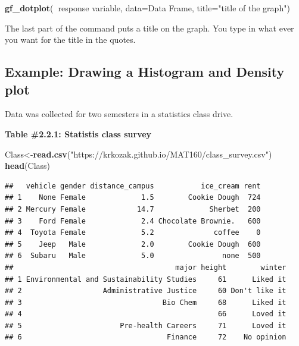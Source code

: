 \documentclass[
]{book}
\newenvironment{Shaded}{\begin{snugshade}}{\end{snugshade}}
\newcommand{\DataTypeTok}[1]{\textcolor[rgb]{0.13,0.29,0.53}{#1}}
\newcommand{\KeywordTok}[1]{\textcolor[rgb]{0.13,0.29,0.53}{\textbf{#1}}}
\newcommand{\NormalTok}[1]{#1}
\newcommand{\OperatorTok}[1]{\textcolor[rgb]{0.81,0.36,0.00}{\textbf{#1}}}
\newcommand{\StringTok}[1]{\textcolor[rgb]{0.31,0.60,0.02}{#1}}
\begin{document}
\begin{Shaded}
\begin{Highlighting}[]
\KeywordTok{gf_dotplot}\NormalTok{(}\OperatorTok{~}\NormalTok{response variable, }\DataTypeTok{data=}\NormalTok{Data Frame, }\DataTypeTok{title=}\StringTok{"title of the graph"}\NormalTok{)}
\end{Highlighting}
\end{Shaded}

The last part of the command puts a title on the graph. You type in what ever you want for the title in the quotes.

\hypertarget{example-drawing-a-histogram-and-density-plot}{%
\subsection{Example: Drawing a Histogram and Density plot}\label{example-drawing-a-histogram-and-density-plot}}

Data was collected for two semesters in a statistics class drive.

\textbf{Table \#2.2.1: Statistis class survey}

\begin{Shaded}
\begin{Highlighting}[]
\NormalTok{Class<-}\KeywordTok{read.csv}\NormalTok{(}\StringTok{"https://krkozak.github.io/MAT160/class_survey.csv"}\NormalTok{)}
\KeywordTok{head}\NormalTok{(Class)}
\end{Highlighting}
\end{Shaded}

\begin{verbatim}
##   vehicle gender distance_campus           ice_cream rent
## 1    None Female             1.5        Cookie Dough  724
## 2 Mercury Female            14.7             Sherbet  200
## 3    Ford Female             2.4 Chocolate Brownie.   600
## 4  Toyota Female             5.2              coffee    0
## 5    Jeep   Male             2.0        Cookie Dough  600
## 6  Subaru   Male             5.0                none  500
##                                      major height        winter
## 1 Environmental and Sustainability Studies     61      Liked it
## 2                   Administrative Justice     60 Don't like it
## 3                                 Bio Chem     68      Liked it
## 4                                              66      Loved it
## 5                       Pre-health Careers     71      Loved it
## 6                                  Finance     72    No opinion
\end{verbatim}
\end{document}
